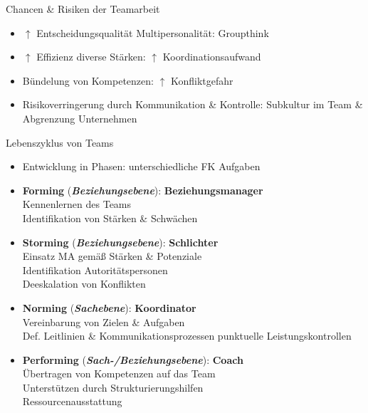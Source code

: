 \documentclass{cheatsheet}
\begin{document}
    \begin{sectionbox}{Chancen \& Risiken der Teamarbeit}
        \begin{itemize}
            \item $\uparrow$ Entscheidungsqualität Multipersonalität: Groupthink
            \item $\uparrow$ Effizienz diverse Stärken: $\uparrow$ Koordinationsaufwand
            \item Bündelung von Kompetenzen: $\uparrow$ Konfliktgefahr
            \item Risikoverringerung durch Kommunikation \& Kontrolle: Subkultur im Team \& Abgrenzung Unternehmen
        \end{itemize}
    \end{sectionbox}
    \begin{sectionbox}{Lebenszyklus von Teams}
        \begin{itemize}
            \item Entwicklung in Phasen: unterschiedliche FK Aufgaben
            \item \textbf{Forming} (\textbf{\emph{Beziehungsebene}}): \textbf{Beziehungsmanager}\\
            \ra Kennenlernen des Teams\\
            \ra Identifikation von Stärken \& Schwächen
            \item \textbf{Storming} (\textbf{\emph{Beziehungsebene}}):  \textbf{Schlichter}\\
            \ra Einsatz MA gemäß Stärken \& Potenziale\\
            \ra Identifikation Autoritätspersonen\\
            \ra Deeskalation von Konflikten 
            \item \textbf{Norming} (\textbf{\emph{Sachebene}}): \textbf{Koordinator}\\
            \ra Vereinbarung von Zielen \& Aufgaben\\
            \ra Def. Leitlinien \& Kommunikationsprozessen
            \ra punktuelle Leistungskontrollen
            \item \textbf{Performing} (\textbf{\emph{Sach-/Beziehungsebene}}): \textbf{Coach}\\
            \ra Übertragen von Kompetenzen auf das Team\\
            \ra Unterstützen durch Strukturierungshilfen\\
            \ra Ressourcenausstattung
        \end{itemize}
    \end{sectionbox}
\end{document}
